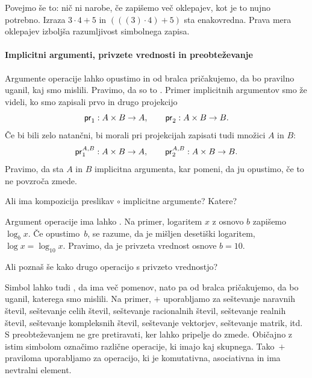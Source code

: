 Povejmo še to: nič ni narobe, če zapišemo več oklepajev, kot je to nujno potrebno. Izraza $3 \cdot 4 + 5$ in $(((3) \cdot 4) + 5)$ sta enakovredna. Prava mera oklepajev izboljša razumljivost simbolnega zapisa.

\paragraph*{Implicitni argumenti, privzete vrednosti in preobteževanje}
\label{sec:implicitni-argumenti}

Argumente operacije lahko opustimo in od bralca pričakujemo, da bo pravilno uganil, kaj smo mislili. Pravimo, da so to
. Primer implicitnih argumentov smo že videli, ko smo zapisali prvo in drugo projekcijo
%
\begin{equation*}
  \fst : A \times B \to A, \qquad
  \snd : A \times B \to B.
\end{equation*}
%
Če bi bili zelo natančni, bi morali pri projekcijah zapisati tudi množici $A$ in $B$:
\begin{equation*}
  \fst[A][B] : A \times B \to A, \qquad
  \snd[A][B] : A \times B \to B.
\end{equation*}
%
%
Pravimo, da sta $A$ in $B$ implicitna argumenta, kar pomeni, da ju opustimo, če to ne povzroča zmede.

\begin{vaja}
  Ali ima kompozicija preslikav $\circ$ implicitne argumente? Katere?
\end{vaja}

Argument operacije ima lahko . Na primer, logaritem $x$ z osnovo $b$ zapišemo $\log_b x$. Če opustimo~$b$, se razume, da je mišljen desetiški logaritem, $\log x = \log_{10} x$. Pravimo, da je privzeta vrednost osnove $b = 10$.

\begin{vaja}
  Ali poznaš še kako drugo operacijo s privzeto vrednostjo?
\end{vaja}

Simbol lahko tudi , da ima več pomenov, nato pa od bralca pričakujemo, da bo uganil, katerega smo
mislili. Na primer, $+$ uporabljamo za
%
seštevanje naravnih števil,
seštevanje celih števil,
seštevanje racionalnih števil,
seštevanje realnih števil,
seštevanje kompleksnih števil,
seštevanje vektorjev,
seštevanje matrik,
itd.
%
S preobteževanjem ne gre pretiravati, ker lahko pripelje do zmede. Običajno z istim simbolom označimo različne operacije, ki imajo kaj skupnega. Tako~$+$ praviloma uporabljamo za operacijo, ki je komutativna, asociativna in ima nevtralni element.


